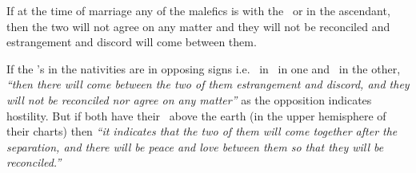 If at the time of marriage any of the malefics is with the \Moon\, or in the ascendant, then the two will not agree on any matter and they will not be reconciled and estrangement and discord will come between them.

If the \Moon's in the nativities are in opposing signs i.e. \Moon\, in \Aries\, in one and \Libra\, in the other,  \textsl{``then there will come between the two of them estrangement and discord, and they will not be reconciled nor agree on any matter''} as the opposition indicates hostility. But if both have their \Moon\, above the earth (in the upper hemisphere of their charts) then \textsl{``it indicates that the two of them will come together after the separation, and there will be peace and love between them so that they will be reconciled.''}





